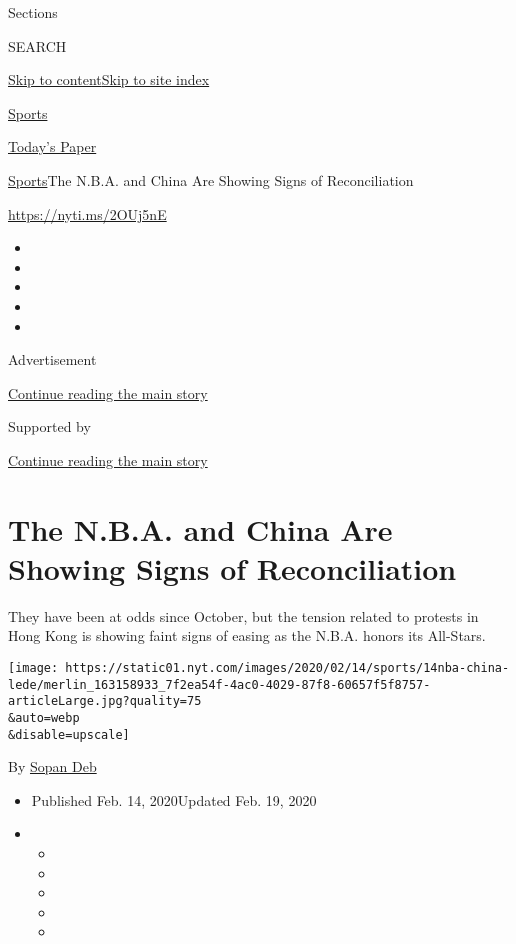 Sections

SEARCH

\protect\hyperlink{site-content}{Skip to
content}\protect\hyperlink{site-index}{Skip to site index}

\href{https://www.nytimes.com/section/sports}{Sports}

\href{https://myaccount.nytimes.com/auth/login?response_type=cookie\&client_id=vi}{}

\href{https://www.nytimes.com/section/todayspaper}{Today's Paper}

\href{/section/sports}{Sports}\textbar{}The N.B.A. and China Are Showing
Signs of Reconciliation

\url{https://nyti.ms/2OUj5nE}

\begin{itemize}
\item
\item
\item
\item
\item
\end{itemize}

Advertisement

\protect\hyperlink{after-top}{Continue reading the main story}

Supported by

\protect\hyperlink{after-sponsor}{Continue reading the main story}

\hypertarget{the-nba-and-china-are-showing-signs-of-reconciliation}{%
\section{The N.B.A. and China Are Showing Signs of
Reconciliation}\label{the-nba-and-china-are-showing-signs-of-reconciliation}}

They have been at odds since October, but the tension related to
protests in Hong Kong is showing faint signs of easing as the N.B.A.
honors its All-Stars.

\texttt{[image: https://static01.nyt.com/images/2020/02/14/sports/14nba-china-lede/merlin\_163158933\_7f2ea54f-4ac0-4029-87f8-60657f5f8757-articleLarge.jpg?quality=75\\\&auto=webp\\\&disable=upscale]}

By \href{https://www.nytimes.com/by/sopan-deb}{Sopan Deb}

\begin{itemize}
\item
  Published Feb. 14, 2020Updated Feb. 19, 2020
\item
  \begin{itemize}
  \item
  \item
  \item
  \item
  \item
  \end{itemize}
\end{itemize}

